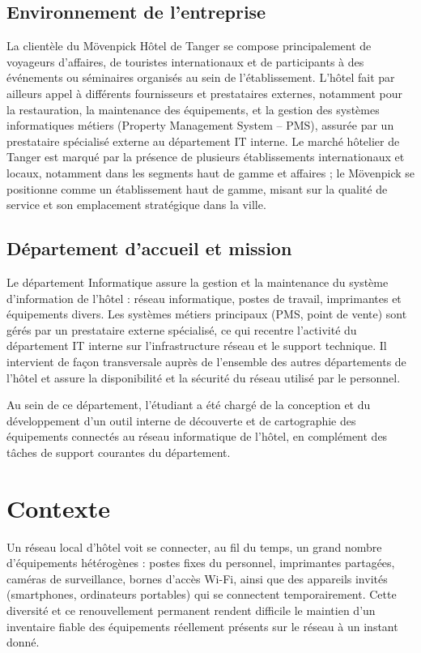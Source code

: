 \subsection{Environnement de l'entreprise}

La clientèle du Mövenpick Hôtel de Tanger se compose principalement de voyageurs
d'affaires, de touristes internationaux et de participants à des événements ou
séminaires organisés au sein de l'établissement. L'hôtel fait par ailleurs appel à
différents fournisseurs et prestataires externes, notamment pour la restauration, la
maintenance des équipements, et la gestion des systèmes informatiques métiers (Property
Management System -- PMS), assurée par un prestataire spécialisé externe au département
IT interne. Le marché hôtelier de Tanger est marqué par la présence de plusieurs
établissements internationaux et locaux, notamment dans les segments haut de gamme et
affaires ; le Mövenpick se positionne comme un établissement haut de gamme, misant sur la
qualité de service et son emplacement stratégique dans la ville.

\subsection{Département d'accueil et mission}

Le département Informatique assure la gestion et la maintenance du système
d'information de l'hôtel : réseau informatique, postes de travail, imprimantes et
équipements divers. Les systèmes métiers principaux (PMS, point de vente) sont gérés par
un prestataire externe spécialisé, ce qui recentre l'activité du département IT interne
sur l'infrastructure réseau et le support technique. Il intervient de façon transversale
auprès de l'ensemble des autres départements de l'hôtel et assure la disponibilité et la
sécurité du réseau utilisé par le personnel.

Au sein de ce département, l'étudiant a été chargé de la conception et du développement
d'un outil interne de découverte et de cartographie des équipements connectés au réseau
informatique de l'hôtel, en complément des tâches de support courantes du département.

\section{Contexte}

Un réseau local d'hôtel voit se connecter, au fil du temps, un grand nombre
d'équipements hétérogènes : postes fixes du personnel, imprimantes partagées, caméras de
surveillance, bornes d'accès Wi-Fi, ainsi que des appareils invités (smartphones,
ordinateurs portables) qui se connectent temporairement. Cette diversité et ce
renouvellement permanent rendent difficile le maintien d'un inventaire fiable des
équipements réellement présents sur le réseau à un instant donné.

